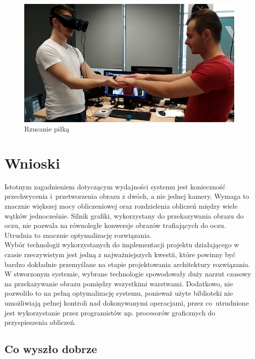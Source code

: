 \documentclass[a4paper,11pt,twoside]{report}
\theoremstyle{definition}
\begin{document}
\begin{description}
\begin{figure}[H]
\centering
\includegraphics[scale=0.25]{images/lapkiTest}
\caption[ThrowingTest]{Rzucanie piłką}
\end{figure}

\end{description}

\section{Wnioski}

Istotnym zagadnieniem dotyczącym wydajności systemu jest konieczność przechwycenia i~przetworzenia obrazu z dwóch, a nie jednej kamery. Wymaga to znacznie większej mocy obliczeniowej oraz rozdzielenia obliczeń między wiele wątków jednocześnie. Silnik grafiki, wykorzystany do przekazywania obrazu do oczu, nie pozwala na równoległe konwersje obrazów trafiających do oczu. Utrudnia to znacznie optymalizację rozwiązania. \\
Wybór technologii wykorzystanych do implementacji projektu działającego w czasie rzeczywistym jest jedną z najważniejszych kwestii, które powinny być bardzo dokładnie przemyślane na etapie projektowania architektury rozwiązania. W stworzonym systemie, wybrane technologie spowodowały duży narzut czasowy na przekazywanie obrazu pomiędzy wszystkimi warstwami. Dodatkowo, nie pozwoliło to na pełną optymalizację systemu, ponieważ użyte biblioteki nie umożliwiają pełnej kontroli nad dokonywanymi operacjami, przez co~utrudnione jest wykorzystanie przez programistów np. procesorów graficznych do przyspieszenia obliczeń.

\subsection{Co wyszło dobrze}
\end{document}
